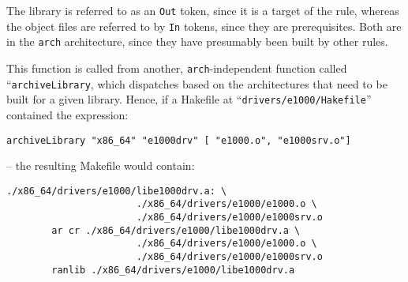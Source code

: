 \documentclass[a4paper,twoside]{report} %
\begin{document}
The library is referred to as an \texttt{Out} token, since it is a target
of the rule, whereas the object files are referred to by \texttt{In}
tokens, since they are prerequisites.   Both are in the \texttt{arch}
architecture, since they have presumably been built by other rules. 

This function is called from another, \texttt{arch}-independent
function called ``\texttt{archiveLibrary}, which dispatches based on
the architectures that need to be built for a given library. 
Hence, if a Hakefile at ``\texttt{drivers/e1000/Hakefile}'' contained
the expression:
\begin{verbatim}
archiveLibrary "x86_64" "e1000drv" [ "e1000.o", "e1000srv.o"]
\end{verbatim}
-- the resulting Makefile would contain:
\begin{verbatim}
./x86_64/drivers/e1000/libe1000drv.a: \
                       ./x86_64/drivers/e1000/e1000.o \
                       ./x86_64/drivers/e1000/e1000srv.o 
        ar cr ./x86_64/drivers/e1000/libe1000drv.a \
                       ./x86_64/drivers/e1000/e1000.o \
                       ./x86_64/drivers/e1000/e1000srv.o 
        ranlib ./x86_64/drivers/e1000/libe1000drv.a
\end{verbatim}
\end{document}
